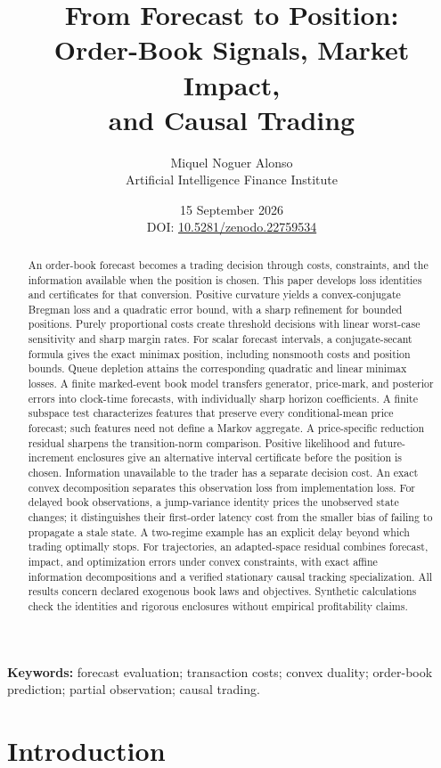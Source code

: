 \documentclass[11pt]{article}
\title{From Forecast to Position:\\
Order-Book Signals, Market Impact,\\
and Causal Trading}
\author{Miquel Noguer Alonso\\
\small Artificial Intelligence Finance Institute}
\date{15 September 2026\\[5pt]\small DOI:
\href{https://doi.org/10.5281/zenodo.22759534}{10.5281/zenodo.22759534}}
\theoremstyle{plain}
\theoremstyle{definition}
\theoremstyle{remark}
\begin{document}
\maketitle
\begin{abstract}
An order-book forecast becomes a trading decision through costs,
constraints, and the information available when the position is
chosen. This paper develops loss identities and certificates for
that conversion. Positive curvature yields a convex-conjugate
Bregman loss and a quadratic error bound, with a sharp refinement
for bounded positions. Purely proportional costs create threshold
decisions with linear worst-case sensitivity and sharp margin
rates. For scalar forecast intervals, a conjugate-secant formula
gives the exact minimax position, including nonsmooth costs and
position bounds. Queue depletion attains the corresponding
quadratic and linear minimax losses.
A finite marked-event book model transfers generator, price-mark,
and posterior errors into clock-time forecasts, with individually
sharp horizon coefficients. A finite subspace test characterizes
features that preserve every conditional-mean price forecast;
such features need not define a Markov aggregate. A price-specific
reduction residual sharpens the transition-norm comparison.
Positive likelihood and future-increment enclosures give an
alternative interval certificate before the position is chosen.
Information unavailable to the trader has a separate decision cost.
An exact convex decomposition separates this observation loss
from implementation loss. For delayed book observations, a
jump-variance identity prices the unobserved state changes; it
distinguishes their first-order latency cost from the smaller
bias of failing to propagate a stale state. A two-regime example
has an explicit delay beyond which trading optimally stops.
For trajectories, an adapted-space residual combines forecast,
impact, and optimization errors under convex constraints, with
exact affine information decompositions and a verified stationary
causal tracking specialization. All results concern declared
exogenous book laws and objectives. Synthetic calculations check
the identities and rigorous enclosures without empirical
profitability claims.
\end{abstract}
\noindent\textbf{Keywords:} forecast evaluation; transaction costs;
convex duality; order-book prediction; partial observation; causal trading.
\clearpage
\tableofcontents
\clearpage

\section{Introduction}
\end{document}
